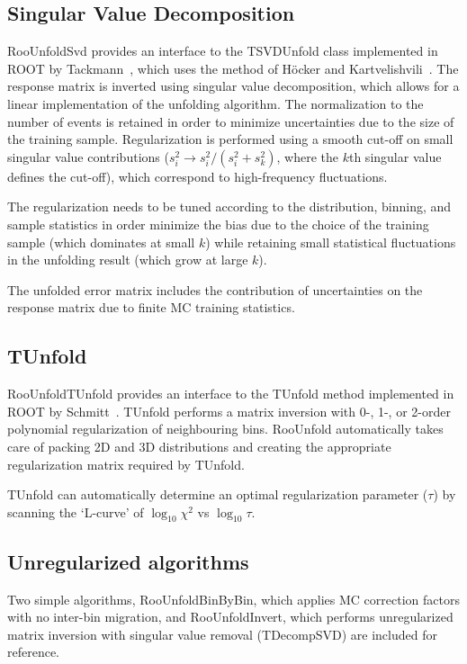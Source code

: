 \documentclass{cernrep}
\begin{document}
\subsection{Singular Value Decomposition}

RooUnfoldSvd provides an interface to the
TSVDUnfold class implemented in ROOT by Tackmann~\cite{Tackmann:PHYSTAT2011}, which
uses the method of H\"ocker and Kartvelishvili~\cite{Hocker:1995kb}.
The response matrix is inverted using singular value decomposition,
which allows for a linear implementation of the unfolding algorithm.
The normalization to the number of events is retained in order to minimize
uncertainties due to the size of the training sample.
Regularization is performed using a smooth cut-off on small singular value contributions
($s_i^2 \rightarrow s_i^2 / (s_i^2 + s_k^2)$, where the $k$th singular value defines the cut-off),
which correspond to high-frequency fluctuations.

The regularization needs to be tuned according to the distribution, binning, and sample statistics
in order minimize the bias due to the choice of the training sample (which dominates at small $k$)
while retaining small statistical fluctuations in the unfolding result (which grow at large $k$).

The unfolded error matrix includes the contribution of uncertainties on the
response matrix due to finite MC training statistics.

\subsection{TUnfold}

RooUnfoldTUnfold provides an interface to the TUnfold method implemented in ROOT by Schmitt~\cite{Schmitt-web}.
TUnfold performs a matrix inversion with 0-, 1-, or 2-order polynomial regularization of neighbouring bins.
RooUnfold automatically takes care of packing 2D and 3D distributions
and creating the appropriate regularization matrix required by TUnfold.

TUnfold can automatically determine an optimal regularization parameter ($\tau$) by scanning the
`L-curve' of $\log_{10} \chi^2$ vs $\log_{10} \tau$.

\subsection{Unregularized algorithms}

Two simple algorithms,
RooUnfoldBinByBin, which applies MC correction factors with no inter-bin migration,
and RooUnfoldInvert, which performs unregularized matrix inversion with singular value removal (TDecompSVD)
are included for reference.
\end{document}
